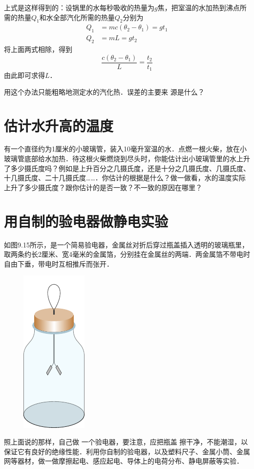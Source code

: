上式是这样得到的：设锅里的水每秒吸收的热量为$g$焦，把室温的水加热到沸点所需的热量$Q_1$和水全部汽化所需的热量$Q_2$分别为
\[\begin{split}
    Q_1&=mc(\theta_2-\theta_1)=gt_1\\
Q_2&=mL=gt_2
\end{split}\]
将上面两式相除，得到
\[\frac{c(\theta_2-\theta_1)}{L}=\frac{t_2}{t_1}  \]
由此即可求得$L$．

用这个办法只能粗略地测定水的汽化热．误差的主要来
源是什么？

\section{估计水升高的温度}
有一个直径约为1厘米的小玻璃管，装入10毫升室温的水．点燃一根火柴，放在小玻璃管底部给水加热．待这根火柴燃烧到尽头时，你能估计出小玻璃管里的水上升了多少摄氏度吗？例如是上升百分之几摄氏度，还是十分之几摄氏度、几摄氏度、十几摄氏度、二十几摄氏度……．你估计的根据是什么？做一做看，水的温度实际上升了多少摄氏度？跟你估计的是否一致？不一致的原因在哪里？

\section{用自制的验电器做静电实验}
如图9.15所示，是一个简易验电器，金属丝对折后穿过瓶盖插入透明的玻璃瓶里，取两条约长2厘米、宽4毫米的金属箔，分别挂在金属丝的两端．两金属箔不带电时自由下垂，带电时互相推斥而张开．
\begin{figure}[htbp]
    \centering
    \includegraphics{fig/B/9-15.pdf}
    \caption{}\label{fig_B_9-15}
\end{figure}

照上面说的那样，自己做
一个验电器，要注意，应把瓶盖
擦干净，不能潮湿，以保证它有良好的绝缘性能．利用你自制的验电器，以及塑料尺子、金属小筒、金属网等器材，做一做摩擦起电、感应起电、导体上的电荷分布、静电屏蔽等实验．

